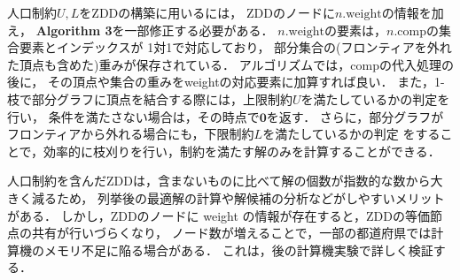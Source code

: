 人口制約$U,L$をZDDの構築に用いるには，
ZDDのノードに$n.\mathrm{weight}$の情報を加え，
\textbf{Algorithm 3}を一部修正する必要がある．
$n.\mathrm{weight}$の要素は，$n.\mathrm{comp}$の集合要素とインデックスが
1対1で対応しており，
部分集合の(フロンティアを外れた頂点も含めた)重みが保存されている．
アルゴリズムでは，compの代入処理の後に，
その頂点や集合の重みをweightの対応要素に加算すれば良い．
また，1-枝で部分グラフに頂点を結合する際には，上限制約$U$を満たしているかの判定を行い，
条件を満たさない場合は，その時点で$\textbf{0}$を返す．
さらに，部分グラフがフロンティアから外れる場合にも，下限制約$L$を満たしているかの判定
をすることで，効率的に枝刈りを行い，制約を満たす解のみを計算することができる．

人口制約を含んだZDDは，含まないものに比べて解の個数が指数的な数から大きく減るため，
列挙後の最適解の計算や解候補の分析などがしやすいメリットがある．
しかし，ZDDのノードに weight の情報が存在すると，ZDDの等価節点の共有が行いづらくなり，
ノード数が増えることで，一部の都道府県では計算機のメモリ不足に陥る場合がある．
これは，後の計算機実験で詳しく検証する．